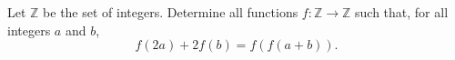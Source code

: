 Let $\mathbb{Z}$ be the set of integers. Determine all functions $f : \mathbb{Z} \to \mathbb{Z}$ such that, for all integers $a$ and $b$,
\[ f(2a) + 2f(b) = f(f(a+b)). \]

